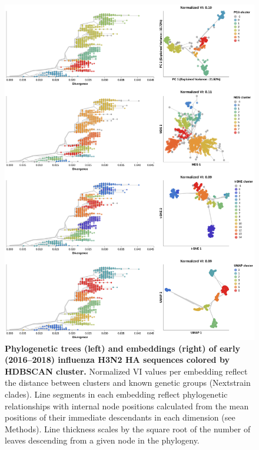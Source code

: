\documentclass[webpdf,contemporary,large,single]{oup-authoring-template}%
\theoremstyle{thmstyleone}%
\theoremstyle{thmstyletwo}%
\theoremstyle{thmstylethree}%
\begin{document}
\begin{figure}[!h]
\includegraphics[width=0.9\columnwidth]{figures/flu-2016-2018-ha-embeddings-by-cluster.png}
\caption{{\bf Phylogenetic trees (left) and embeddings (right) of early (2016--2018) influenza H3N2 HA sequences colored by HDBSCAN cluster.}
  Normalized VI values per embedding reflect the distance between clusters and known genetic groups (Nextstrain clades).
  Line segments in each embedding reflect phylogenetic relationships with internal node positions calculated from the mean positions of their immediate descendants in each dimension (see Methods).
  Line thickness scales by the square root of the number of leaves descending from a given node in the phylogeny.}
\label{fig:seasonal-influenza-h3n2-ha-2016-2018-clusters}
\end{figure}
\end{document}
